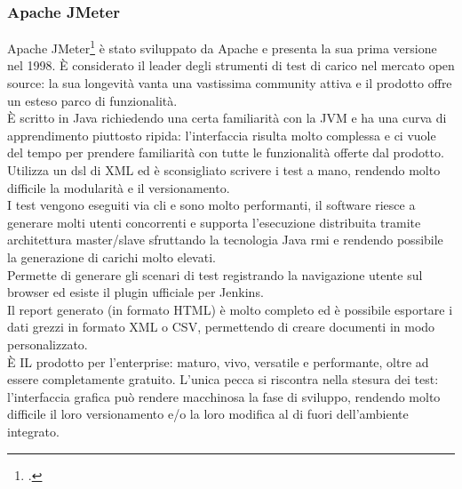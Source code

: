 \subsubsection{Apache JMeter}
Apache JMeter\footcite{site:jmeter} è stato sviluppato da Apache e presenta la sua prima versione nel 1998. È considerato il leader degli strumenti di test di carico nel mercato open source: la sua longevità vanta una vastissima community attiva e il prodotto offre un esteso parco di funzionalità.\\ 
È scritto in Java richiedendo una certa familiarità con la JVM e ha una curva di apprendimento piuttosto ripida: l'interfaccia risulta molto complessa e ci vuole del tempo per prendere familiarità con tutte le funzionalità offerte dal prodotto.\\
Utilizza un \gls{dsl} di XML ed è sconsigliato scrivere i test a mano, rendendo molto difficile la modularità e il versionamento.\\
I test vengono eseguiti via \gls{cli} e sono molto performanti, il software riesce a generare molti utenti concorrenti e supporta l'esecuzione distribuita tramite architettura master/slave sfruttando la tecnologia Java \gls{rmi} e rendendo possibile la generazione di carichi molto elevati. \\
Permette di generare gli scenari di test registrando la navigazione utente sul browser ed esiste il \gls{plugin}  ufficiale per Jenkins.\\
Il report generato (in formato HTML) è molto completo ed è possibile esportare i dati grezzi in formato XML o CSV, permettendo di creare documenti in modo personalizzato. \\
È IL prodotto per l'enterprise: maturo, vivo, versatile e performante, oltre ad essere completamente gratuito. L'unica pecca si riscontra nella stesura dei test: l'interfaccia grafica può rendere macchinosa la fase di sviluppo, rendendo molto difficile il loro versionamento e/o la loro modifica al di fuori dell'ambiente integrato.
